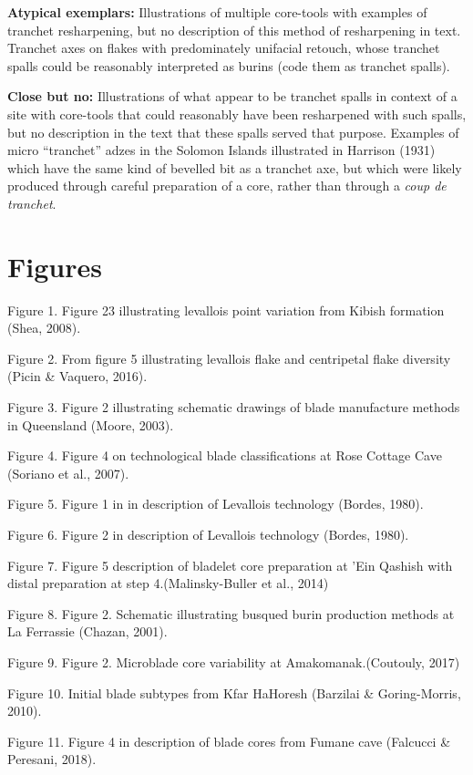 \documentclass[
]{article}
\begin{document}
\textbf{Atypical exemplars:} Illustrations of multiple core-tools with
examples of tranchet resharpening, but no description of this method of
resharpening in text. Tranchet axes on flakes with predominately
unifacial retouch, whose tranchet spalls could be reasonably interpreted
as burins (code them as tranchet spalls).

\textbf{Close but no:} Illustrations of what appear to be tranchet
spalls in context of a site with core-tools that could reasonably have
been resharpened with such spalls, but no description in the text that
these spalls served that purpose. Examples of micro ``tranchet'' adzes
in the Solomon Islands illustrated in Harrison (1931) which have the
same kind of bevelled bit as a tranchet axe, but which were likely
produced through careful preparation of a core, rather than through a
\emph{coup de tranchet}.

\hypertarget{figures}{%
\section{Figures}\label{figures}}

Figure 1. Figure 23 illustrating levallois point variation from Kibish
formation (Shea, 2008).

Figure 2. From figure 5 illustrating levallois flake and centripetal
flake diversity (Picin \& Vaquero, 2016).

Figure 3. Figure 2 illustrating schematic drawings of blade manufacture
methods in Queensland (Moore, 2003).

Figure 4. Figure 4 on technological blade classifications at Rose
Cottage Cave (Soriano et al., 2007).

Figure 5. Figure 1 in in description of Levallois technology (Bordes,
1980).

Figure 6. Figure 2 in description of Levallois technology (Bordes,
1980).

Figure 7. Figure 5 description of bladelet core preparation at 'Ein
Qashish with distal preparation at step 4.(Malinsky-Buller et al., 2014)

Figure 8. Figure 2. Schematic illustrating busqued burin production
methods at La Ferrassie (Chazan, 2001).

Figure 9. Figure 2. Microblade core variability at Amakomanak.(Coutouly,
2017)

Figure 10. Initial blade subtypes from Kfar HaHoresh (Barzilai \&
Goring-Morris, 2010).

Figure 11. Figure 4 in description of blade cores from Fumane cave
(Falcucci \& Peresani, 2018).
\end{document}
